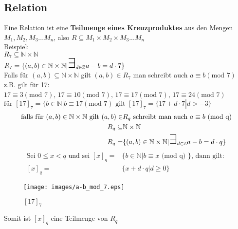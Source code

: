 \documentclass[a4paper]{scrartcl}
\newcommand\bigexists{\mbox{\huge $\exists$}}
\begin{document}
\subsection{Relation}
Eine Relation ist eine \textbf{Teilmenge eines Kreuzproduktes} aus den Mengen $M_1, M_2, M_3 ... M_n$, also $R \subseteq  M_1 \times M_2 \times M_3 ... M_n$ \\
\newline
Beispiel:\\
$R_7 \subseteq  \mathbb{N} \times \mathbb{N}$ \\
$R_7 = \{(a,b) \in \mathbb{N} \times \mathbb{N} | \bigexists_{d \in \mathbb{Z}  }  a-b=d \cdot 7 \}$ \\
\newline
Falls für $(a,b) \subseteq  \mathbb{N} \times \mathbb{N}$ gilt $(a,b) \in R_7$ man schreibt auch $a \equiv b (\text{mod 7})$ \\
z.B. gilt für 17: \\
$17 \equiv 3 (\text{mod 7})$, 
$17 \equiv 10 (\text{mod 7})$, 
$17 \equiv 17 (\text{mod 7})$, 
$17 \equiv 24 (\text{mod 7})$ \\
$\text{für } [17]_7 = \{ b \in \mathbb{N} | b \equiv 17 (\text{mod 7}) \text{ gilt } [17]_7 = \{ 17 + d \cdot 7 | d > -3\} $ 
\begin{align}
\text{falls für } (a,b) \in \mathbb{N} \times \mathbb{N}  \text{ gilt } (a,b) \in& R_q \text{ schreibt man auch }  a \equiv b \text{ (mod q)} \\
R_q \subseteq&  \mathbb{N} \times \mathbb{N} \\
R_q =& \{(a,b) \in \mathbb{N} \times \mathbb{N} | \bigexists_{d \in \mathbb{Z}  }  a-b=d \cdot q \} 
\end{align}
\begin{align}
\text{Sei } 0 \leq x < q \text{ und sei } [x]_q =& \{ b \in \mathbb{N} | b \equiv x \text{ (mod q) }\} \text{, dann gilt: } \\
[x]_q =& \{ x + d \cdot q | d \geq 0\}
\end{align}
\begin{figure}[h!]
\begin{center}
\texttt{[image: images/a-b\_mod\_7.eps]}
\caption{$[17]_7$}
\label{labelname}
\end{center}
\end{figure}
Somit ist $[x]_q$ eine Teilmenge von $R_q$ 
\newline
\end{document}
